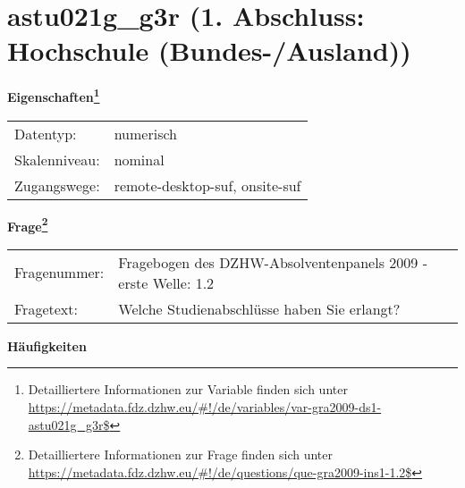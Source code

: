 
    \setcounter{footnote}{0}

    \vspace*{-1.8cm}
	\section{astu021g\_g3r (1. Abschluss: Hochschule (Bundes-/Ausland))}
	\label{section:astu021g_g3r}



    \vspace*{0.5cm}
    \noindent\textbf{Eigenschaften\footnote{Detailliertere Informationen zur Variable finden sich unter
		\url{https://metadata.fdz.dzhw.eu/\#!/de/variables/var-gra2009-ds1-astu021g_g3r$}}}\\
	\begin{tabularx}{\hsize}{@{}lX}
	Datentyp: & numerisch \\
	Skalenniveau: & nominal \\
	Zugangswege: &
	  remote-desktop-suf, 
	  onsite-suf
 \\
    \end{tabularx}



				\vspace*{0.5cm}
                \noindent\textbf{Frage\footnote{Detailliertere Informationen zur Frage finden sich unter
		              \url{https://metadata.fdz.dzhw.eu/\#!/de/questions/que-gra2009-ins1-1.2$}}}\\
				\begin{tabularx}{\hsize}{@{}lX}
					Fragenummer: &
					  Fragebogen des DZHW-Absolventenpanels 2009 - erste Welle:
					  1.2
 \\
					Fragetext: & Welche Studienabschlüsse haben Sie erlangt? \\
				\end{tabularx}





        		\vspace*{0.5cm}
                \noindent\textbf{Häufigkeiten}

